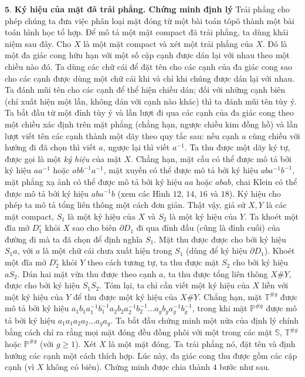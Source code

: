 \begin{multicols}{2}	
	$\pmb{5.}$ \textbf{\color{duongvaotoanhoc}Ký hiệu của mặt đã trải phẳng. Chứng minh định lý}
	\vskip 0.1cm
	Trải phẳng cho phép chúng ta đưa việc phân loại mặt đóng từ một bài toán tôpô thành một bài toán hình học tổ hợp. Để mô tả một mặt compact đã trải phẳng, ta dùng khái niệm sau đây. Cho $X$ là một mặt compact và xét một trải phẳng của $X$. Đó là một đa giác cong hữu hạn với một số cặp cạnh được dán lại với nhau theo một chiều nào đó. Ta dùng các chữ cái để đặt tên cho các cạnh của đa giác cong sao cho các cạnh được dùng một chữ cái khi và chỉ khi chúng được dán lại với nhau. Ta đánh mũi tên cho các cạnh để thể hiện chiều dán; đối với những cạnh biên (chỉ xuất hiện một lần, không dán với cạnh nào khác) thì ta đánh mũi tên tùy ý. Ta bắt đầu từ một đỉnh tùy ý và lần lượt đi qua các cạnh của đa giác cong theo một chiều xác định trên mặt phẳng (chẳng hạn, ngược chiều kim đồng hồ) và lần lượt viết tên các cạnh thành một dãy theo quy tắc sau: nếu cạnh $a$ cùng chiều với hướng đi đã chọn thì viết $a$, ngược lại thì viết $a^{-1}$. Ta thu được một dãy ký tự, được gọi là một {\it ký hiệu} của mặt $X$.
	\vskip 0.1cm
	Chẳng hạn, mặt cầu có thể được mô tả bởi ký hiệu $aa^{-1}$ hoặc $abb^{-1}a^{-1}$, mặt xuyến có thể được mô tả bởi ký hiệu $aba^{-1}b^{-1}$, mặt phẳng xạ ảnh có thể được mô tả bởi ký hiệu $aa$ hoặc $abab$, chai Klein có thể được mô tả bởi ký hiệu $aba^{-1}b$ (xem các Hình $12$, $14$, $16$ và $18$).
	\vskip 0.1cm
	Ký hiệu cho phép ta mô tả tổng liên thông một cách đơn giản. Thật vậy, giả sử $X, Y$ là các mặt compact, $S_1$ là một ký hiệu của $X$ và $S_2$ là một ký hiệu của $Y$. Ta khoét một đĩa mở $D_1^\circ$ khỏi $X$ sao cho biên $\partial D_1$ đi qua đỉnh đầu (cũng là đỉnh cuối) của đường đi mà ta đã chọn để định nghĩa $S_1$. Mặt thu được được cho bởi ký hiệu $S_1a$, với $a$ là một chữ cái chưa xuất hiện trong $S_1$ (dùng để ký hiệu $\partial D_1$). Khoét một đĩa mở $D_2^\circ$ khỏi $Y$ theo cách tương tự, ta thu được mặt $S_2$ cho bởi ký hiệu $aS_2$. Dán hai mặt vừa thu được theo cạnh $a$, ta thu được tổng liên thông $X \# Y$, được cho bởi ký hiệu $S_1S_2$. Tóm lại, ta chỉ cần viết một ký hiệu của $X$ liền với một ký hiệu của $Y$ để thu được một ký hiệu của $X \# Y$. Chẳng hạn, mặt $\mathbb{T}^{\# g}$ được mô tả bởi ký hiệu $a_1b_1a_1^{-1}b_1^{-1}a_2b_2a_2^{-1}b_2^{-1}\ldots a_gb_ga_g^{-1} b_g^{-1}$, trong khi mặt $\mathbb{P}^{\# g}$ được mô tả bởi ký hiệu $a_1a_1a_2a_2\ldots a_ga_g$.
	\vskip 0.1cm
	Ta bắt đầu chứng minh một nửa của định lý chính bằng cách chỉ ra rằng mọi mặt đóng đều đồng phôi với một trong các mặt $\mathbb{S}$, $\mathbb{T}^{\#g}$ hoặc $\mathbb{P}^{\#g}$ (với $g \ge 1$). Xét $X$ là một mặt đóng. Ta trải phẳng nó, đặt tên và định hướng các cạnh một cách thích hợp. Lúc này, đa giác cong thu được gồm các cặp cạnh (vì $X$ không có biên). Chứng minh được chia thành $4$ bước như sau.

\end{multicols}
